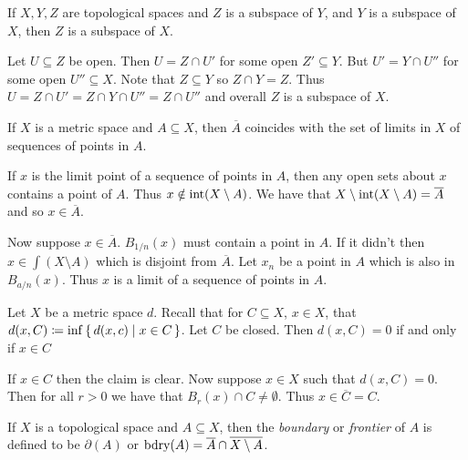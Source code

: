 \documentclass[letterpaper, 11pt, oneside]{book}
\begin{document}
\begin{prop}
  If $X, Y, Z$ are topological spaces and $Z$ is a subspace of $Y$, and $Y$ is a subspace of $X$, then $Z$ is a subspace of $X$.
\end{prop}
\begin{pf}
  Let $U \subseteq Z$ be open.
  Then $U = Z \cap U'$ for some open $Z' \subseteq Y$.
  But $U' = Y \cap U''$ for some open $U'' \subseteq X$.
  Note that $Z \subseteq Y$ so $Z \cap Y = Z$.
  Thus $U = Z \cap U' = Z \cap Y \cap U'' = Z \cap U''$ and overall $Z$ is a subspace of $X$.
\end{pf}

\begin{prop}
  If $X$ is a metric space and $A \subseteq X$, then $\overline{A}$ coincides with the set of limits in $X$ of sequences of points in $A$.
\end{prop}
\begin{pf}
  If $x$ is the limit point of a sequence of points in $A$, then any open sets about $x$ contains a point of $A$.
  Thus $x \notin \operatorname{int}(X \setminus A)$.
  We have that $X \setminus \operatorname{int}(X \setminus A) = \overline{A}$ and so $x \in \overline{A}$.

  Now suppose $x \in \overline{A}$.
  $B_{1 / n}(x)$ must contain a point in $A$.
  If it didn't then $x \in \int(X \setminus A)$ which is disjoint from $\overline{A}$.
  Let $x_{n}$ be a point in $A$ which is also in $B_{a / n}(x)$.
  Thus $x$ is a limit of a sequence of points in $A$.
\end{pf}

\clearpage

\begin{prop}\label{prop: closed_dist_inf_0}
  Let $X$ be a metric space $d$.
  Recall that for $C \subseteq X$, $x \in X$, that $d(x, C) \coloneqq \inf\set{d(x, c) | x \in C}$.
  Let $C$ be closed.
  Then $d(x, C) = 0$ if and only if $x \in C$
\end{prop}
\begin{pf}
  If $x \in C$ then the claim is clear.
  Now suppose $x \in X$ such that $d(x, C) = 0$.
  Then for all $r > 0$ we have that $B_{r}(x) \cap C \neq \emptyset$.
  Thus $x \in \overline{C} = C$.
\end{pf}

\begin{defn}[Boundary]
  If $X$ is a topological space and $A \subseteq X$, then the \emph{boundary} or \emph{frontier} of $A$ is defined to be $\partial(A)$ or $\operatorname{bdry}(A) = \overline{A} \cap \overline{X \setminus A}$.
\end{defn}
\end{document}
